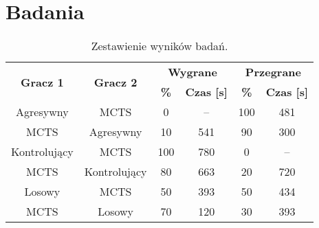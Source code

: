 \pagebreak
\section{Badania}

\begin{table}[H]
	\centering
	\begin{tabular}{|c|c|c|c|c|c|}
		\hline
		\multirow{2}{*}{\textbf{Gracz 1}} & \multirow{2}{*}{\textbf{Gracz 2}} & \multicolumn{2}{|c|}{\textbf{Wygrane}} & \multicolumn{2}{|c|}{\textbf{Przegrane}} \\
		\cline{3-6}
		& & \textbf{\%} & \textbf{Czas [s]} & \textbf{\%} & \textbf{Czas [s]} \\
		\hline
		Agresywny & MCTS & 0 & -- & 100 & 481 \\
		\hline
		MCTS & Agresywny & 10 & 541 & 90 & 300  \\
		\hline \hline
		Kontrolujący & MCTS & 100 & 780 & 0 & --  \\
		\hline
		MCTS & Kontrolujący & 80 & 663 & 20 & 720 \\
		\hline \hline
		Losowy & MCTS & 50 & 393 & 50 & 434 \\
		\hline
		MCTS & Losowy & 70 & 120 & 30 & 393 \\ 
		\hline
	\end{tabular}
	\caption{Zestawienie wyników badań.}
\end{table}